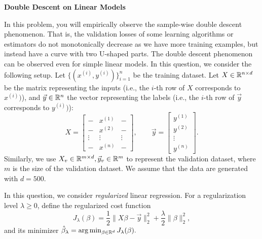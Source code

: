 \item {\bf Double Descent on Linear Models}


In this problem, you will empirically observe the sample-wise double descent phenomenon. That is, the validation losses of some learning algorithms or estimators do not monotonically decrease as we have more training examples, but instead have a curve with two U-shaped parts. The double descent phenomenon can be observed even for simple linear models. In this question, we consider the following setup. Let $\{(x^{(i)},y^{(i)})\}_{i=1}^{n}$ be the training dataset. Let $X\in\mathbb{R}^{n\times d}$ be the matrix representing the inputs (i.e., the $i$-th row of $X$ corresponds to $x^{(i)})$), and $\vec{y}\in\mathbb{R}^{n}$ the vector representing the labels (i.e., the $i$-th row of $\vec{y}$ corresponds to $y^{(i)})$):
$$
X=
\begin{bmatrix}
	- & x^{(1)} & - \\
	- & x^{(2)} & - \\
	\vdots & \vdots & \vdots\\
	- & x^{(n)} & - 
\end{bmatrix},\qquad
\vec{y}=
\begin{bmatrix}
	y^{(1)} \\
	y^{(2)}\\
	\vdots\\
	y^{(n)}
\end{bmatrix}.
$$
Similarly, we use $X_v\in \mathbb{R}^{m\times d}, \vec{y}_v\in \mathbb{R}^{m}$ to represent the validation dataset, where $m$ is the size of the validation dataset. We assume that the data are generated with $d=500$. 

In this question, we consider \emph{regularized} linear regression. For a regularization level $\lambda\ge 0$, define the regularized cost function $$J_\lambda(\beta)=\frac{1}{2}\|X\beta-\vec{y}\|_2^2+\frac{\lambda}{2}\|\beta\|_2^2,$$ and its minimizer $\hat{\beta}_\lambda=\arg\min_{\beta\in \mathbb{R}^{d}}J_\lambda(\beta).$

\begin{enumerate}
  

  

  
\end{enumerate}
